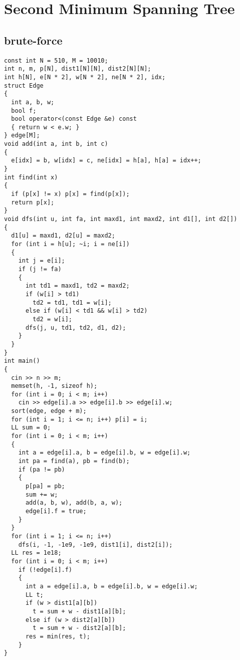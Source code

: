 \section{Second Minimum Spanning Tree}
\subsection{brute-force}
\begin{lstlisting}
const int N = 510, M = 10010;
int n, m, p[N], dist1[N][N], dist2[N][N];
int h[N], e[N * 2], w[N * 2], ne[N * 2], idx;
struct Edge
{
  int a, b, w;
  bool f;
  bool operator<(const Edge &e) const
  { return w < e.w; }
} edge[M];
void add(int a, int b, int c)
{
  e[idx] = b, w[idx] = c, ne[idx] = h[a], h[a] = idx++;
}
int find(int x)
{
  if (p[x] != x) p[x] = find(p[x]);
  return p[x];
}
void dfs(int u, int fa, int maxd1, int maxd2, int d1[], int d2[])
{
  d1[u] = maxd1, d2[u] = maxd2;
  for (int i = h[u]; ~i; i = ne[i])
  {
    int j = e[i];
    if (j != fa)
    {
      int td1 = maxd1, td2 = maxd2;
      if (w[i] > td1)
        td2 = td1, td1 = w[i];
      else if (w[i] < td1 && w[i] > td2)
        td2 = w[i];
      dfs(j, u, td1, td2, d1, d2);
    }
  }
}
int main()
{
  cin >> n >> m;
  memset(h, -1, sizeof h);
  for (int i = 0; i < m; i++)
    cin >> edge[i].a >> edge[i].b >> edge[i].w;
  sort(edge, edge + m);
  for (int i = 1; i <= n; i++) p[i] = i;
  LL sum = 0;
  for (int i = 0; i < m; i++)
  {
    int a = edge[i].a, b = edge[i].b, w = edge[i].w;
    int pa = find(a), pb = find(b);
    if (pa != pb)
    {
      p[pa] = pb;
      sum += w;
      add(a, b, w), add(b, a, w);
      edge[i].f = true;
    }
  }
  for (int i = 1; i <= n; i++)
    dfs(i, -1, -1e9, -1e9, dist1[i], dist2[i]);
  LL res = 1e18;
  for (int i = 0; i < m; i++)
    if (!edge[i].f)
    {
      int a = edge[i].a, b = edge[i].b, w = edge[i].w;
      LL t;
      if (w > dist1[a][b])
        t = sum + w - dist1[a][b];
      else if (w > dist2[a][b])
        t = sum + w - dist2[a][b];
      res = min(res, t);
    }
}
\end{lstlisting}
